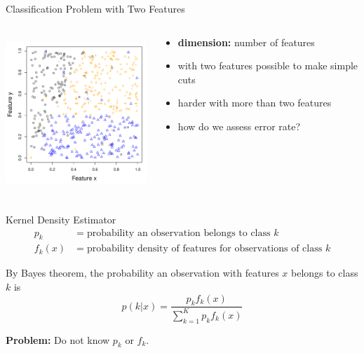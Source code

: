 \documentclass[12pt]{beamer}
\begin{document}
\begin{frame}{Classification Problem with Two Features}
\begin{columns}[T] %

\begin{column}{.5\textwidth}
\includegraphics[height=2.3in,width=2.3in]{figs/sim_features.pdf}
\end{column}
\begin{column}{.5\textwidth}
  \begin{itemize}
  \item \textbf{dimension:} number of features
  \item with two features possible to make simple cuts
  \item harder with more than two features
  \item how do we assess error rate?
  \end{itemize}
\end{column}

\end{columns}

\end{frame}


\begin{frame}{Kernel Density Estimator}
  \begin{align*}
    p_k &= \text{probability an observation belongs to class } k\\
    f_k(x) &= \text{probability density of features for observations of class } k
  \end{align*}

\vspace{.2in}
  
  By Bayes theorem, the probability an observation with features $x$ belongs to class $k$ is
  \begin{equation*}
    p(k|x) = \frac{p_k f_k(x)}{\sum_{k=1}^K p_k f_k(x)}
  \end{equation*}

\textbf{Problem:} Do not know $p_k$ or $f_k$.  
\end{frame}
\end{document}
